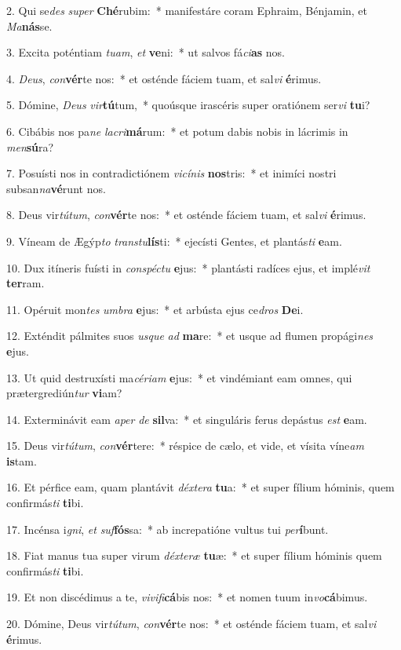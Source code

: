 2. Qui se\textit{des} \textit{su}\textit{per} \textbf{Ché}rubim:~*  manifestáre coram Ephraim, Bénjamin, et \textit{Ma}\textbf{nás}se.\

3. Excita poténtiam \textit{tu}\textit{am}, \textit{et} \textbf{ve}ni:~*  ut salvos fá\textit{ci}\textbf{as} nos.\

4. \textit{De}\textit{us}, \textit{con}\textbf{vér}te nos:~*  et osténde fáciem tuam, et sal\textit{vi} \textbf{é}rimus.\

5. Dómine, \textit{De}\textit{us} \textit{vir}\textbf{tú}tum,~*  quoúsque irascéris super oratiónem ser\textit{vi} \textbf{tu}i?\

6. Cibábis nos pa\textit{ne} \textit{la}\textit{cri}\textbf{má}rum:~*  et potum dabis nobis in lácrimis in \textit{men}\textbf{sú}ra?\

7. Posuísti nos in contradictiónem \textit{vi}\textit{cí}\textit{nis} \textbf{nos}tris:~*  et inimíci nostri subsan\textit{na}\textbf{vé}runt nos.\

8. Deus vir\textit{tú}\textit{tum}, \textit{con}\textbf{vér}te nos:~*  et osténde fáciem tuam, et sal\textit{vi} \textbf{é}rimus.\

9. Víneam de Ægýp\textit{to} \textit{trans}\textit{tu}\textbf{lís}ti:~*  ejecísti Gentes, et plantás\textit{ti} \textbf{e}am.\

10. Dux itíneris fuísti in \textit{con}\textit{spéc}\textit{tu} \textbf{e}jus:~*  plantásti radíces ejus, et implé\textit{vit} \textbf{ter}ram.\

11. Opéruit mon\textit{tes} \textit{um}\textit{bra} \textbf{e}jus:~*  et arbústa ejus ce\textit{dros} \textbf{De}i.\

12. Exténdit pálmites suos \textit{us}\textit{que} \textit{ad} \textbf{ma}re:~*  et usque ad flumen propági\textit{nes} \textbf{e}jus.\

13. Ut quid destruxísti ma\textit{cé}\textit{ri}\textit{am} \textbf{e}jus:~*  et vindémiant eam omnes, qui prætergrediún\textit{tur} \textbf{vi}am?\

14. Exterminávit eam \textit{a}\textit{per} \textit{de} \textbf{sil}va:~*  et singuláris ferus depástus \textit{est} \textbf{e}am.\

15. Deus vir\textit{tú}\textit{tum}, \textit{con}\textbf{vér}tere:~*  réspice de cælo, et vide, et vísita víne\textit{am} \textbf{is}tam.\

16. Et pérfice eam, quam plantávit \textit{déx}\textit{te}\textit{ra} \textbf{tu}a:~*  et super fílium hóminis, quem confirmás\textit{ti} \textbf{ti}bi.\

17. Incénsa i\textit{gni}, \textit{et} \textit{suf}\textbf{fós}sa:~*  ab increpatióne vultus tui \textit{per}\textbf{í}bunt.\

18. Fiat manus tua super virum \textit{déx}\textit{te}\textit{ræ} \textbf{tu}æ:~*  et super fílium hóminis quem confirmás\textit{ti} \textbf{ti}bi.\

19. Et non discédimus a te, \textit{vi}\textit{vi}\textit{fi}\textbf{cá}bis nos:~*  et nomen tuum in\textit{vo}\textbf{cá}bimus.\

20. Dómine, Deus vir\textit{tú}\textit{tum}, \textit{con}\textbf{vér}te nos:~*  et osténde fáciem tuam, et sal\textit{vi} \textbf{é}rimus.\

